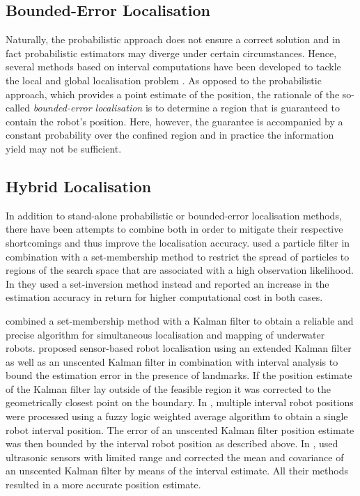 \subsection{Bounded-Error Localisation}

Naturally, the probabilistic approach does not ensure a correct solution and in fact probabilistic estimators may diverge under certain circumstances. Hence, several methods based on interval computations have been developed to tackle the local and global localisation problem \cite{le2012set, meizel2002initial, seignez_interval2008, Kieffer2000, kieffer1999guaranteed, seignez2009real, jaulin2009, jaulin2006localization, 5354673}. As opposed to the probabilistic approach, which provides a point estimate of the position, the rationale of the so-called \emph{bounded-error localisation} is to determine a region that is guaranteed to contain the robot's position. Here, however, the guarantee is accompanied by a constant probability over the confined region and in practice the information yield may not be sufficient.

\subsection{Hybrid Localisation}

In addition to stand-alone probabilistic or bounded-error localisation methods, there have been attempts to combine both in order to mitigate their respective shortcomings and thus improve the localisation accuracy. \citeauthor{neulandh_ybridazation} \cite{neulandh_ybridazation} used a particle filter in combination with a set-membership method to restrict the spread of particles to regions of the search space that are associated with a high observation likelihood. In \cite{neuland_set_inversion} they used a set-inversion method instead and reported an increase in the estimation accuracy in return for higher computational cost in both cases. 

\citeauthor{nicol2017} \cite{nicol2017} combined a set-membership method with a Kalman filter to obtain a reliable and precise algorithm for simultaneous localisation and mapping of underwater robots. \citeauthor{ashokaraj2004sensor} proposed sensor-based robot localisation using an extended Kalman filter \cite{ashokaraj2004sensor} as well as an unscented Kalman filter \cite{ashokaraj2004sensorukf} in combination with interval analysis to bound the estimation error in the presence of landmarks. If the position estimate of the Kalman filter lay outside of the feasible region it was corrected to the geometrically closest point on the boundary. In \cite{ashokaraj2004fuzzy}, multiple interval robot positions were processed using a fuzzy logic weighted average algorithm to obtain a single robot interval position. The error of an unscented Kalman filter position estimate was then bounded by the interval robot position as described above. In \cite{ashokaraj2004mobile}, \citeauthor{ashokaraj2004mobile} used ultrasonic sensors with limited range and corrected the mean and covariance of an unscented Kalman filter by means of the interval estimate. All their methods resulted in a more accurate position estimate.


